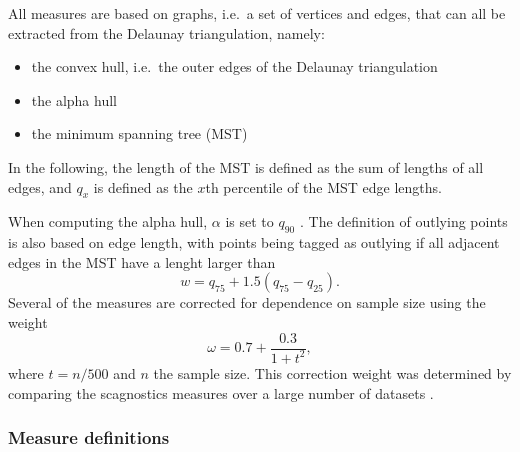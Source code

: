 All measures are based on graphs, i.e.~a set of vertices and edges, that
can all be extracted from the Delaunay triangulation, namely:

\begin{itemize}
\tightlist
\item
  the convex hull, i.e.~the outer edges of the Delaunay triangulation
\item
  the alpha hull \citep{1056714}
\item
  the minimum spanning tree (MST) \citep{kruskal1956}
\end{itemize}

In the following, the length of the MST is defined as the sum of lengths
of all edges, and \(q_x\) is defined as the \(x\)th percentile of the
MST edge lengths.

When computing the alpha hull, \(\alpha\) is set to \(q_{90}\)
\citep{scag}. The definition of outlying points is also based on edge
length, with points being tagged as outlying if all adjacent edges in
the MST have a lenght larger than \begin{equation}
w = q_{75} + 1.5 ( q_{75} - q_{25}).
\end{equation} Several of the measures are corrected for dependence on
sample size using the weight \begin{equation}
\omega = 0.7 + \frac{0.3}{1+t^2},
\end{equation} where \(t = n / 500\) and \(n\) the sample size. This
correction weight was determined by comparing the scagnostics measures
over a large number of datasets \citep{scag}.

\hypertarget{measure-definitions}{%
\subsubsection{Measure definitions}\label{measure-definitions}}

